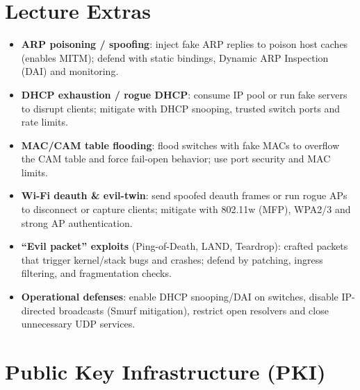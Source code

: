 \documentclass[11pt]{article}
\begin{document}
\section{Lecture Extras}

\begin{itemize}
  \item \textbf{ARP poisoning / spoofing}: inject fake ARP replies to poison host caches (enables MITM); defend with static bindings, Dynamic ARP Inspection (DAI) and monitoring.
  
  \item \textbf{DHCP exhaustion / rogue DHCP}: consume IP pool or run fake servers to disrupt clients; mitigate with DHCP snooping, trusted switch ports and rate limits.
  
  \item \textbf{MAC/CAM table flooding}: flood switches with fake MACs to overflow the CAM table and force fail-open behavior; use port security and MAC limits.
  
  \item \textbf{Wi-Fi deauth \& evil-twin}: send spoofed deauth frames or run rogue APs to disconnect or capture clients; mitigate with 802.11w (MFP), WPA2/3 and strong AP authentication.
  
  \item \textbf{``Evil packet'' exploits} (Ping-of-Death, LAND, Teardrop): crafted packets that trigger kernel/stack bugs and crashes; defend by patching, ingress filtering, and fragmentation checks.
  
  \item \textbf{Operational defenses}: enable DHCP snooping/DAI on switches, disable IP-directed broadcasts (Smurf mitigation), restrict open resolvers and close unnecessary UDP services.
\end{itemize}

\section{Public Key Infrastructure (PKI)}
\end{document}
